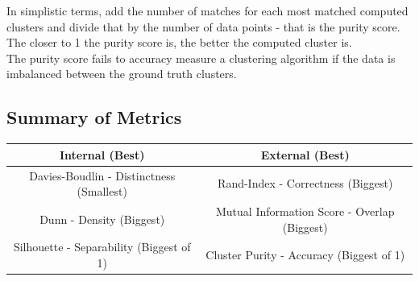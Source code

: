 \documentclass{article}
\begin{document}
In simplistic terms, add the number of matches for each most matched computed clusters and divide that by the number of data points - that is the purity score. The closer to 1 the purity score is, the better the computed cluster is.\\
The purity score fails to accuracy measure a clustering algorithm if the data is imbalanced between the ground truth clusters.\\

\subsection{Summary of Metrics}

\begin{center}
\begin{tabular}{| c | c |}
\hline
 \textbf{Internal} (Best) & \textbf{External} (Best) \\ 
 \hline
 Davies-Boudlin - Distinctness (Smallest) & Rand-Index - Correctness (Biggest) \\  
 \hline
 Dunn - Density (Biggest) & Mutual Information Score - Overlap (Biggest)\\
 \hline
 Silhouette - Separability (Biggest of 1) & Cluster Purity - Accuracy (Biggest of 1)\\
 \hline
\end{tabular}
\end{center}

\end{document}
